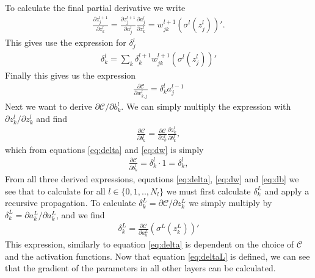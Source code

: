 To calculate the final partial derivative we write
\begin{align*}
    \frac{\partial z_j^{l+1}}{\partial z^l_k} = \frac{\partial z_j^{l+1}}{\partial a^l_j}\frac{\partial a^l_j}{\partial z^l_k}
                                              = w_{jk}^{l+1}(\sigma^l(z_j^l))'.
\end{align*}
This gives use the expression for $\delta_j^l$
\begin{align}\label{eq:delta}
    \delta_k^l  = \sum_k \delta_k^{l+1}w_{jk}^{l+1}(\sigma^l(z_j^l))'  
\end{align}
Finally this gives us the expression
\begin{align}\label{eq:dw}
    \frac{\partial \mathcal{C}}{\partial w_{k,j}^l} = \delta_k^{l} a_j^{l-1}
\end{align}
Next we want to derive $\partial \mathcal{C}/\partial b^l_k$. We can simply multiply the expression 
with $\partial z^l_k/\partial z_k^l$ and find
\begin{align*}
    \frac{\partial \mathcal{C}}{\partial b^l_k} = \frac{\partial \mathcal{C}}{\partial z^l_k}\frac{\partial z_k^l}{\partial b^l_k},
\end{align*}
which from equations \ref{eq:delta} and \ref{eq:dw} is simply
\begin{align}\label{eq:db}
    \frac{\partial \mathcal{C}}{\partial b^l_k} = \delta_k^{l} \cdot 1 = \delta_k^{l},
\end{align}
From all three derived expressions, equations \ref{eq:delta}, \ref{eq:dw} and \ref{eq:db} we see that 
to calculate for all $l\in\{0,1,..,N_l\}$ we must first calculate $\delta_k^L$ and apply a recursive propagation.
To calculate $\delta_k^L = \partial \mathcal{C}/\partial z^L_k$ we simply multiply by $\delta_k^L = \partial a_k^L/\partial a_k^L$, and we find
\begin{align}\label{eq:deltaL}
    \delta_k^L = \frac{\partial \mathcal{C}}{\partial a^L_k}\left(\sigma^L(z_k^L)\right)'
\end{align}
This expression, similarly to equation \ref{eq:delta} is dependent on the choice of $\mathcal{C}$ and 
the activation functions. Now that equation \ref{eq:deltaL} is defined, we can see that the
gradient of the parameters in all other layers can be calculated. 






